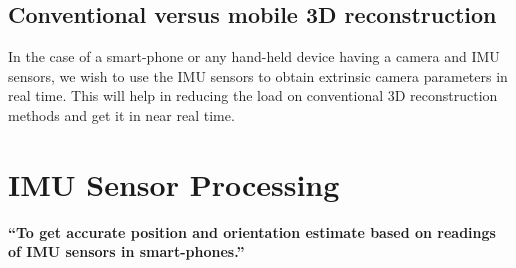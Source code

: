 \documentclass{article}
\begin{document}
			\subsection{Conventional versus mobile 3D reconstruction}
				In the case of a smart-phone or any hand-held device having a camera and IMU sensors, we wish to use  the IMU sensors to obtain extrinsic camera parameters in real time. This will help in reducing the load on conventional 3D reconstruction methods and get it in near real time.


	\section{IMU Sensor Processing}
		\textbf{``To get accurate position and orientation estimate based on readings of IMU sensors in smart-phones.''}
		\\
\end{document}
